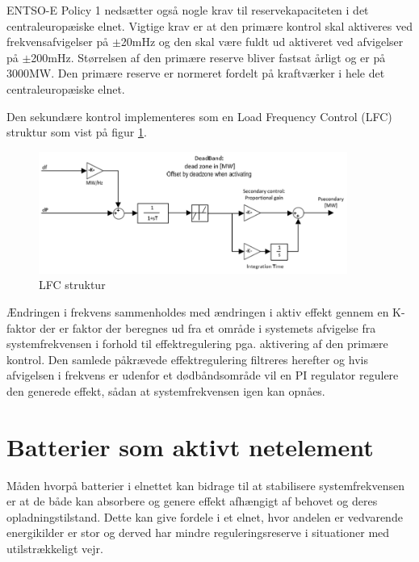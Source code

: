 ENTSO-E Policy 1 nedsætter også nogle krav til reservekapaciteten i det centraleuropæiske elnet. Vigtige krav er at den primære kontrol skal aktiveres ved frekvensafvigelser på $\pm$20mHz og den skal være fuldt ud aktiveret ved afvigelser på $\pm$200mHz. Størrelsen af den primære reserve bliver fastsat årligt og er på 3000MW. Den primære reserve er normeret fordelt på kraftværker i hele det centraleuropæiske elnet.

Den sekundære kontrol implementeres som en Load Frequency Control (LFC) struktur som vist på figur \ref{fig:sekundaerkontrol}. 

\begin{figure}[H]
	\centering
	\includegraphics[width=0.9\textwidth]{figurer/Sekundaer_kontrol}
	\caption{LFC struktur}
	\label{fig:sekundaerkontrol}
\end{figure}

Ændringen i frekvens sammenholdes med ændringen i aktiv effekt gennem en K-faktor der er faktor der beregnes ud fra et område i systemets afvigelse fra systemfrekvensen i forhold til effektregulering pga. aktivering af den primære kontrol. Den samlede påkrævede effektregulering filtreres herefter og hvis afvigelsen i frekvens er udenfor et dødbåndsområde vil en PI regulator regulere den generede effekt, sådan at systemfrekvensen igen kan opnåes.


\section{Batterier som aktivt netelement}

Måden hvorpå batterier i elnettet kan bidrage til at stabilisere systemfrekvensen er at de både kan absorbere og genere effekt afhængigt af behovet og deres opladningstilstand. Dette kan give fordele i et elnet, hvor andelen er vedvarende energikilder er stor og derved har mindre reguleringsreserve i situationer med utilstrækkeligt vejr.


